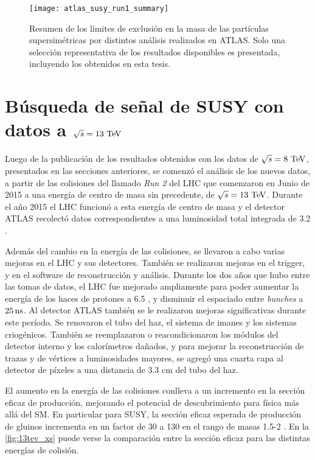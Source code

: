 \begin{figure}[!htb]
  \centering

  \texttt{[image: atlas\_susy\_run1\_summary]}

  \caption{Resumen de los límites de exclusión en la masa de las partículas
    supersimétricas por distintos análisis realizados en ATLAS. Solo una
    selección representativa de los resultados disponibles es
    presentada\cite{susy_summary}, incluyendo los obtenidos en esta tesis.}
  \label{fig:susy_summary}

\end{figure}



\section{Búsqueda de señal de SUSY con datos a $\sqrt{s} = 13 \tev$}
\label{sec:results13tev}

Luego de la publicación de los resultados obtenidos con los datos de
$\sqrt{s}=8\tev$, presentados en las secciones anteriores, se comenzó el
análisis de los nuevos datos, a partir de las colisiones del llamado \emph{Run
  2} del LHC que comenzaron en Junio de 2015 a una energía de centro de masa sin
precedente, de $\sqrt{s} = 13 \tev$. Durante el a\~no 2015 el LHC funcionó a
esta energía de centro de masa y el detector ATLAS recolectó datos
correspondientes a una luminosidad total integrada de 3.2 \ifb.

Además del cambio en la energía de las colisiones, se llevaron a cabo varias
mejoras en el LHC y sus detectores. También se realizaron mejoras en el trigger, y en el
software de reconstrucción y análisis.
Durante los dos a\~nos que hubo entre las tomas de datos, el LHC fue mejorado
ampliamente para poder aumentar la energía de los haces de protones a 6.5
\tev, y disminuir el espaciado entre \emph{bunches} a $\unit[25]{ns}$.
Al detector ATLAS también se le realizaron mejoras significativas durante este período.
Se renovaron el tubo del haz, el sistema de imanes y los sistemas criogénicos. También se
reemplazaron o reacondicionaron los módulos del detector interno y los
calorímetros dañados, y para mejorar la reconstrucción de trazas y de vértices a
luminosidades mayores, se agregó una cuarta capa al detector de píxeles a una
distancia de 3.3 cm del tubo del haz.

El aumento en la energía de las colisiones conlleva a un incremento en la
sección eficaz de producción, mejorando el potencial de descubrimiento para
física más allá del SM. En particular para SUSY, la sección eficaz esperada de
producción de gluinos incrementa en un factor de 30 a 130 en el rango de masas
1.5-2 {\tev}. En la \cref{fig:13tev_xs} puede verse la comparación entre la
sección eficaz para las distintas energías de colisión.

